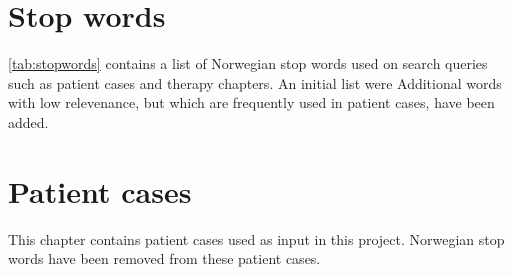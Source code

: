 \documentclass[11pt,a4paper]{report}
\begin{document}
%


\appendix
\chapter{Stop words}
\autoref{tab:stopwords} contains a list of Norwegian stop words used on search
queries such as patient cases and therapy chapters.
An initial list were %
Additional words with low relevenance, but which are frequently used in
patient cases, have been added.


\chapter{Patient cases}
This chapter contains patient cases used as input in this project.
Norwegian stop words have been removed from these patient cases.

\end{document}
